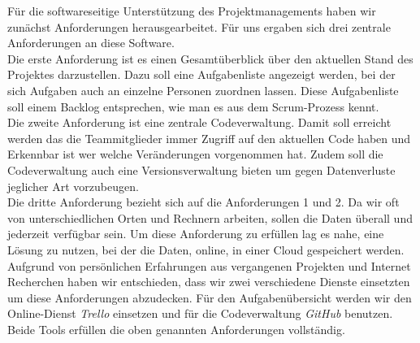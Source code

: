 Für die softwareseitige Unterstützung des Projektmanagements haben wir zunächst Anforderungen herausgearbeitet. Für uns ergaben sich drei zentrale Anforderungen an diese Software. \\
Die erste Anforderung ist es einen Gesamtüberblick über den aktuellen Stand des Projektes darzustellen. Dazu soll eine Aufgabenliste angezeigt werden, bei der sich Aufgaben auch an einzelne Personen zuordnen lassen. Diese Aufgabenliste soll einem Backlog entsprechen, wie man es aus dem Scrum-Prozess kennt.\\
Die zweite Anforderung ist eine zentrale Codeverwaltung. Damit soll erreicht werden das die Teammitglieder immer Zugriff auf den aktuellen Code haben und Erkennbar ist wer welche Veränderungen vorgenommen hat. Zudem soll die Codeverwaltung auch eine Versionsverwaltung bieten um gegen Datenverluste jeglicher Art vorzubeugen.\\
Die dritte Anforderung bezieht sich auf die Anforderungen 1 und 2. Da wir oft von unterschiedlichen Orten und Rechnern arbeiten, sollen die Daten überall und jederzeit verfügbar sein. Um diese Anforderung zu erfüllen lag es nahe, eine Lösung zu nutzen, bei der die Daten, online, in einer Cloud gespeichert werden.
Aufgrund von persönlichen Erfahrungen aus vergangenen Projekten und Internet Recherchen haben wir entschieden, dass wir zwei verschiedene Dienste einsetzten um diese Anforderungen abzudecken. Für den Aufgabenübersicht werden wir den Online-Dienst \textit{Trello} einsetzen und für die Codeverwaltung \textit{GitHub} benutzen. Beide Tools erfüllen die oben genannten Anforderungen vollständig.


